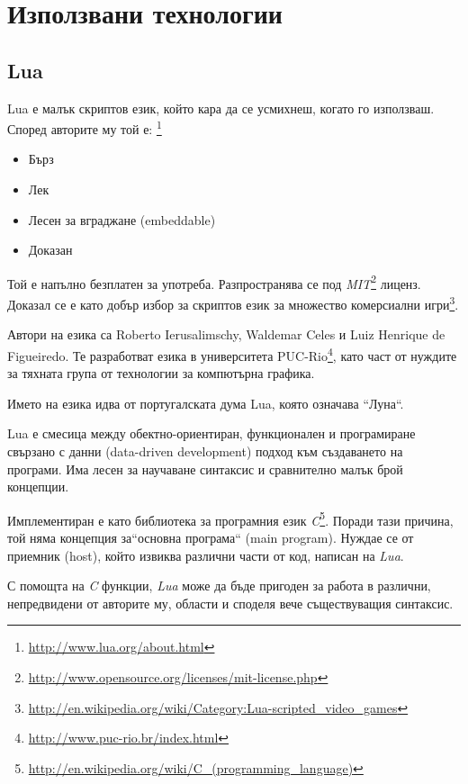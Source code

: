 \chapter{Използвани технологии}

	\section{Lua}
	
		Lua е малък скриптов език, който кара да се усмихнеш, когато го използваш. 
		Според авторите му той е: \footnote{\url{http://www.lua.org/about.html}} 
		
		\begin{itemize}			
			\item Бърз				
			\item Лек				
			\item Лесен за вграджане (embeddable)				
			\item Доказан				
		\end{itemize}
		
		Той е напълно безплатен за употреба. Разпространява се под 
		\emph{MIT}\footnote{\url{http://www.opensource.org/licenses/mit-license.php}} лиценз. 
		Доказал се е като добър избор за скриптов език за множество комерсиални 
		игри\footnote{\url{http://en.wikipedia.org/wiki/Category:Lua-scripted_video_games}}.
		
		Автори на езика са Roberto Ierusalimschy, Waldemar Celes и Luiz Henrique de Figueiredo. Те разработват езика в
		университета PUC-Rio\footnote{\url{http://www.puc-rio.br/index.html}}, като част от нуждите за тяхната група
		от технологии за компютърна графика. 
		
		Името на езика идва от португалската дума Lua, която означава ``Луна``.
		
		Lua е смесица между обектно-ориентиран, функционален и програмиране свързано с данни (data-driven development)
		подход към създаването на програми. Има лесен за научаване синтаксис и сравнително малък брой концепции. 
		
		Имплементиран е като библиотека за програмния език \emph{C}\footnote{\url{http://en.wikipedia.org/wiki/C_(programming_language)}}. 
		Поради тази причина, той няма концепция за``основна програма`` (main program). Нуждае се от приемник (host), който извиква различни
		части от код, написан на \emph{Lua}.
		
		С помощта на \emph{C} функции, \emph{Lua} може да бъде пригоден за работа в различни, непредвидени от авторите му,
		области и споделя вече съществуващия синтаксис.
		
